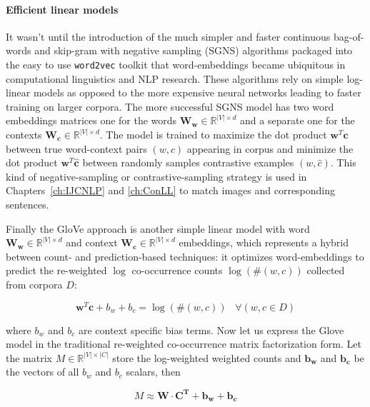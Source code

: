 \paragraph{Efficient linear models}
It wasn't until the introduction of the much simpler and faster continuous bag-of-words
and skip-gram with negative sampling (SGNS) algorithms \cite{mikolov2013efficient}
packaged into the easy to use \texttt{word2vec} toolkit that
word-embeddings became ubiquitous in computational linguistics and NLP research.
These algorithms rely on simple log-linear models as opposed to the more expensive
neural networks leading to faster training on larger corpora. The more successful SGNS
model has two word embeddings matrices one for the words
$\mathbf{W_w}  \in \mathbb{R}^{|V| \times d}$
and a separate one for the contexts $\mathbf{W_c} \in \mathbb{R}^{|V| \times d}$.
The model is trained to maximize the dot product $\mathbf{w}^T\mathbf{c}$
between true word-context pairs $(w,c)$ appearing in corpus and minimize the
dot product $\mathbf{w}^T\mathbf{\hat{c}}$ between randomly
samples contrastive examples $(w,\hat{c})$. This kind of negative-sampling or
contrastive-sampling strategy is used in Chapters~\ref{ch:IJCNLP} and \ref{ch:ConLL} to
match images and corresponding sentences.

Finally the GloVe approach \citep{pennington2014glove} is another simple linear model
with word $\mathbf{W_w}  \in \mathbb{R}^{|V| \times d}$ and context
$\mathbf{W_c} \in \mathbb{R}^{|V| \times d}$ embeddings, which
represents a hybrid between count- and prediction-based techniques:
it optimizes word-embeddings to predict the re-weighted
$\log$ co-occurrence counts $\log(\#(w,c))$ collected from corpora $D$:

\begin{equation}
\label{eq:glove}
\mathbf{w}^T\mathbf{c} + b_w + b_c = \log(\#(w,c))\;\;\; \forall (w,c \in D)
\end{equation}

where $b_w$ and $b_c$ are context specific bias terms.
Now let us express the Glove model in the traditional re-weighted
co-occurrence matrix factorization form.
Let the matrix $M \in \mathbb{R}^{|V| \times |C|}$ store the log-weighted
weighted counts and $\mathbf{b_w}$ and $\mathbf{b_c}$ be the vectors of all
$b_w$ and $b_c$ scalars, then

\begin{equation}
\label{eq:glove2}
M \approx \mathbf{W} \cdot \mathbf{C^T} + \mathbf{b_w} + \mathbf{b_c}
\end{equation}

